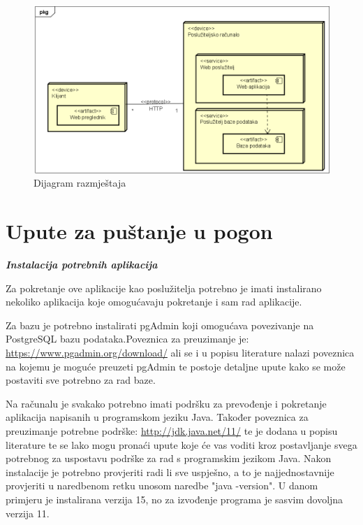 		\begin{figure}[H]
				\includegraphics[scale=0.7]{slike/DijagramRazmjestaja.PNG} %
				\centering
				\caption{Dijagram razmještaja}
				\label{fig:java}
			\end{figure}
			
			\eject
			
		\section{Upute za puštanje u pogon}
		
			\textbf{\textit{Instalacija potrebnih aplikacija}}
			
			Za pokretanje ove aplikacije kao poslužitelja potrebno je imati instalirano nekoliko aplikacija koje omogućavaju pokretanje i sam rad aplikacije.
		
			Za bazu je potrebno instalirati pgAdmin koji omogućava povezivanje na PostgreSQL bazu podataka.Poveznica za preuzimanje je: \url{https://www.pgadmin.org/download/} ali se i u  popisu literature nalazi poveznica na kojemu je moguće preuzeti pgAdmin te postoje detaljne upute kako se može postaviti sve potrebno za rad baze.
		
			Na računalu je svakako potrebno imati podršku za prevođenje i pokretanje aplikacija napisanih u programskom jeziku Java. Također poveznica za preuzimanje potrebne podrške: \url{http://jdk.java.net/11/} te je dodana u popisu literature te se lako mogu pronaći upute koje će vas voditi kroz postavljanje svega potrebnog za uspostavu podrške za rad s programskim jezikom Java. Nakon instalacije je potrebno provjeriti radi li sve uspješno, a to je najjednostavnije provjeriti u naredbenom retku unosom naredbe "java -version". U danom primjeru je instalirana verzija 15, no za izvođenje programa je sasvim dovoljna verzija 11. 
			
